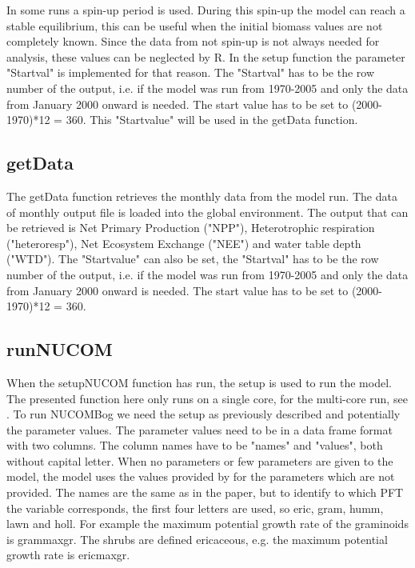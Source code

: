 \documentclass{article}\usepackage[]{graphicx}\usepackage[]{color}
\begin{document}
In some runs a spin-up period is used. During this spin-up the model can reach a stable equilibrium, this can be useful when the initial biomass values are not completely known. Since the data from not spin-up is not always needed for analysis, these values can be neglected by R. In the setup function the parameter "Startval" is implemented for that reason. The "Startval" has to be the row number of the output, i.e. if the model was run from 1970-2005 and only the data from January 2000 onward is needed. The start value has to be set to (2000-1970)*12 = 360. This "Startvalue" will be used in the getData function.

\subsection*{getData} \label{ssec:getData}
The getData function retrieves the monthly data from the model run. The data of monthly output file is loaded into the global environment.
The output that can be retrieved is Net Primary Production ("NPP"), Heterotrophic respiration ("hetero\textunderscore resp"), Net Ecosystem Exchange ("NEE") and water table depth ("WTD"). The "Startvalue" can also be set, the "Startval" has to be the row number of the output, i.e. if the model was run from 1970-2005 and only the data from January 2000 onward is needed. The start value has to be set to (2000-1970)*12 = 360.

\subsection*{runNUCOM} \label{ssec:runNUCOM}
When the setupNUCOM function has run, the setup is used to run the model. The presented function here only runs on a single core, for the multi-core run, see . To run NUCOMBog we need the setup as previously described and potentially the parameter values. The parameter values need to be in a data frame format with two columns. The column names have to be "names" and "values", both without capital letter. When no parameters or few parameters are given to the model, the model uses the values provided by \cite{Heijmans2008a} for the parameters which are not provided. The names are the same as in the paper, but to identify to which PFT the variable corresponds, the first four letters are used, so eric, gram, humm, lawn and holl. For example the maximum potential growth rate of the graminoids is gram\textunderscore maxgr. The shrubs are defined ericaceous, e.g. the maximum potential growth rate is eric\textunderscore maxgr.
\end{document}
